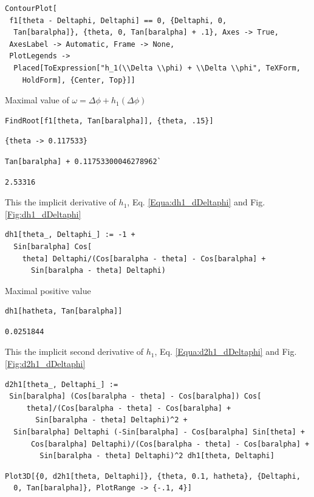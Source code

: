 \documentclass[reqno]{amsart}
\theoremstyle{definition} \newtheorem{definition}{Definition}[section]
\theoremstyle{definition} \newtheorem{remark}[definition]{Remark}
\theoremstyle{plain} \newtheorem{lemma}[definition]{Lemma}
\theoremstyle{plain} \newtheorem{proposition}[definition]{Proposition}
\theoremstyle{plain} \newtheorem{theorem}[definition]{Theorem}
\theoremstyle{plain} \newtheorem{corollary}[definition]{Corollary}
\theoremstyle{definition} \newtheorem{example}[definition]{Example}
\theoremstyle{plain} \newtheorem{claim}[clai]{Claim}
\theoremstyle{definition} \newtheorem{assumption}[definition]{Assumption}
\theoremstyle{definition} \newtheorem{observation}[definition]{Observation}
\newcommand{\1}{\mathbbm 1}
\newcommand{\smed}{\medskip}
\numberwithin{equation}{section} %
\theoremstyle{plain} \newtheorem*{theorem*}{Theorem}
\theoremstyle{plain} \newtheorem{mthm}[maintheorem]{Main Theorem}
\theoremstyle{plain} \newtheorem*{mthm*}{Main Theorem}
\theoremstyle{plain} \newtheorem*{conjecture*}{Conjecture}
\theoremstyle{plain} \newtheorem{conjecture}[definition]{Conjecture}
\theoremstyle{plain} \newtheorem*{problem*}{Problem}
\begin{document}
\begin{verbatim}
ContourPlot[
 f1[theta - Deltaphi, Deltaphi] == 0, {Deltaphi, 0, 
  Tan[baralpha]}, {theta, 0, Tan[baralpha] + .1}, Axes -> True, 
 AxesLabel -> Automatic, Frame -> None, 
 PlotLegends -> 
  Placed[ToExpression["h_1(\\Delta \\phi) + \\Delta \\phi", TeXForm, 
    HoldForm], {Center, Top}]]
\end{verbatim}
\smed
Maximal value of $\omega = \Delta \phi + h_1(\Delta \phi)$
\smed
\begin{verbatim}
FindRoot[f1[theta, Tan[baralpha]], {theta, .15}]
\end{verbatim}
\begin{verbatim}
{theta -> 0.117533}
\end{verbatim}
\begin{verbatim}
Tan[baralpha] + 0.11753300046278962`
\end{verbatim}
\begin{verbatim}
2.53316
\end{verbatim}
\smed
This the implicit derivative of $h_1$, Eq. \eqref{Equa:dh1_dDeltaphi} and Fig. \ref{Fig:dh1_dDeltaphi}
\smed
\begin{verbatim}
dh1[theta_, Deltaphi_] := -1 + 
  Sin[baralpha] Cos[
    theta] Deltaphi/(Cos[baralpha - theta] - Cos[baralpha] + 
      Sin[baralpha - theta] Deltaphi)
\end{verbatim}
\smed
Maximal positive value
\smed
\begin{verbatim}
dh1[hatheta, Tan[baralpha]]
\end{verbatim}
\begin{verbatim}
0.0251844
\end{verbatim}
\smed
This the implicit second derivative of $h_1$, Eq. \eqref{Equa:d2h1_dDeltaphi} and Fig. \ref{Fig:d2h1_dDeltaphi}
\smed
\begin{verbatim}
d2h1[theta_, Deltaphi_] := 
 Sin[baralpha] (Cos[baralpha - theta] - Cos[baralpha]) Cos[
     theta]/(Cos[baralpha - theta] - Cos[baralpha] + 
       Sin[baralpha - theta] Deltaphi)^2 + 
  Sin[baralpha] Deltaphi (-Sin[baralpha] - Cos[baralpha] Sin[theta] + 
      Cos[baralpha] Deltaphi)/(Cos[baralpha - theta] - Cos[baralpha] +
        Sin[baralpha - theta] Deltaphi)^2 dh1[theta, Deltaphi]
\end{verbatim}
\begin{verbatim}
Plot3D[{0, d2h1[theta, Deltaphi]}, {theta, 0.1, hatheta}, {Deltaphi, 
  0, Tan[baralpha]}, PlotRange -> {-.1, 4}]
\end{verbatim}
\end{document}
